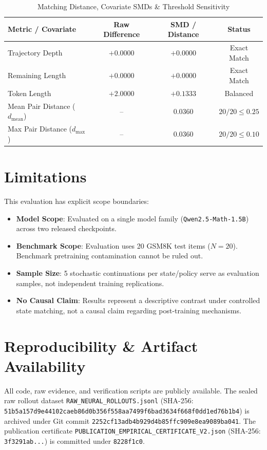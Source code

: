 \documentclass[10pt,conference]{IEEEtran}
\begin{document}
\begin{table}[htbp]
\caption{Matching Distance, Covariate SMDs \& Threshold Sensitivity}
\label{tab:sensitivity}
\centering
\begin{tabular}{lccc}
\toprule
\textbf{Metric / Covariate} & \textbf{Raw Difference} & \textbf{SMD / Distance} & \textbf{Status} \\
\midrule
Trajectory Depth & $+0.0000$ & $+0.0000$ & Exact Match \\
Remaining Length & $+0.0000$ & $+0.0000$ & Exact Match \\
Token Length & $+2.0000$ & $+0.1333$ & Balanced \\
\midrule
Mean Pair Distance ($d_{\text{mean}}$) & -- & $0.0360$ & $20/20 \le 0.25$ \\
Max Pair Distance ($d_{\max}$) & -- & $0.0360$ & $20/20 \le 0.10$ \\
\bottomrule
\end{tabular}
\end{table}

\section{Limitations}
This evaluation has explicit scope boundaries:
\begin{itemize}
    \item \textbf{Model Scope}: Evaluated on a single model family (\texttt{Qwen2.5-Math-1.5B}) across two released checkpoints.
    \item \textbf{Benchmark Scope}: Evaluation uses 20 GSM8K test items ($N=20$). Benchmark pretraining contamination cannot be ruled out.
    \item \textbf{Sample Size}: 5 stochastic continuations per state/policy serve as evaluation samples, not independent training replications.
    \item \textbf{No Causal Claim}: Results represent a descriptive contrast under controlled state matching, not a causal claim regarding post-training mechanisms.
\end{itemize}

\section{Reproducibility \& Artifact Availability}
All code, raw evidence, and verification scripts are publicly available. The sealed raw rollout dataset \texttt{RAW\_NEURAL\_ROLLOUTS.jsonl} (SHA-256: \texttt{51b5a157d9e44102caeb86d0b356f558aa7499f6bad3634f668f0dd1ed76b1b4}) is archived under Git commit \texttt{2252cf13adb4b929d4b85ffc909e8ea9089ba041}. The publication certificate \texttt{PUBLICATION\_EMPIRICAL\_CERTIFICATE\_V2.json} (SHA-256: \texttt{3f3291ab...}) is committed under \texttt{8228f1c0}.
\end{document}
